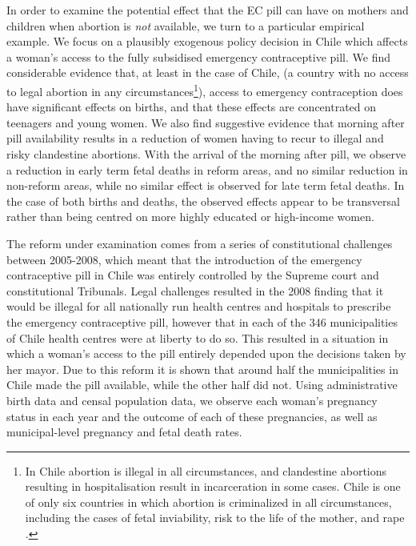 In order to examine the potential effect that the EC pill can have on mothers
and children when abortion is \emph{not} available, we turn to a particular
empirical example.  We focus on a plausibly exogenous policy decision in Chile 
which affects a woman's access to the fully subsidised emergency contraceptive 
pill.  We find considerable evidence that, at least in the case of Chile, (a 
country with no access to legal abortion in any circumstances\footnote{In Chile 
abortion is illegal in all circumstances, and clandestine abortions resulting 
in hospitalisation result in incarceration in some cases.  Chile is one of only 
six countries in which abortion is criminalized in all circumstances, including 
the cases of fetal inviability, risk to the life of the mother, and rape 
\citep{UN2014}.}), access to emergency contraception does 
have significant effects on births, and that these effects are concentrated on 
teenagers and young women.  We also find suggestive evidence that morning after
pill availability results in a reduction of women having to recur to illegal 
and risky clandestine abortions.  With the arrival of the morning after pill, 
we observe a reduction in early term fetal deaths in reform areas, and no 
similar reduction in non-reform areas, while no similar effect is observed for
late term fetal deaths.  In the case of both births and deaths, the observed 
effects appear to be transversal rather than being centred on more highly 
educated or high-income women. 

The reform under examination comes from a series of constitutional challenges 
between 2005-2008, which meant that the introduction of the emergency contraceptive 
pill in Chile was entirely controlled by the Supreme court and constitutional 
Tribunals.  Legal challenges resulted in the 2008 finding that it would be illegal 
for all nationally run health centres and hospitals to prescribe the emergency 
contraceptive pill, however that in each of the 346 municipalities of Chile health 
centres were at liberty to do so.  This resulted  in a situation in which a woman's 
access to the pill entirely depended upon the decisions taken by her mayor.  Due 
to this reform it is shown that around half the municipalities in Chile made the 
pill available, while the other half did not.  Using administrative birth data and 
censal population data, we observe each woman's pregnancy status in each year and 
the outcome of each of these pregnancies, as well as municipal-level pregnancy and 
fetal death rates.

